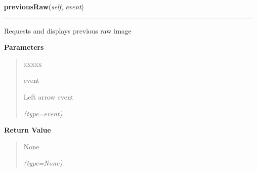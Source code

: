\hspace{.8\funcindent}\begin{boxedminipage}{\funcwidth}

    \raggedright \textbf{previousRaw}(\textit{self}, \textit{event})

    \vspace{-1.5ex}

    \rule{\textwidth}{0.5\fboxrule}
\setlength{\parskip}{2ex}
    Requests and displays previous raw image

\setlength{\parskip}{1ex}
      \textbf{Parameters}
      \vspace{-1ex}

      \begin{quote}
        \begin{Ventry}{xxxxx}

          \item[event]

          Left arrow event

            {\it (type=event)}

        \end{Ventry}

      \end{quote}

      \textbf{Return Value}
    \vspace{-1ex}

      \begin{quote}
      None

      {\it (type=None)}

      \end{quote}

    \end{boxedminipage}

    \label{client_gui:GuiClass:submitCropped}

    \vspace{0.5ex}

